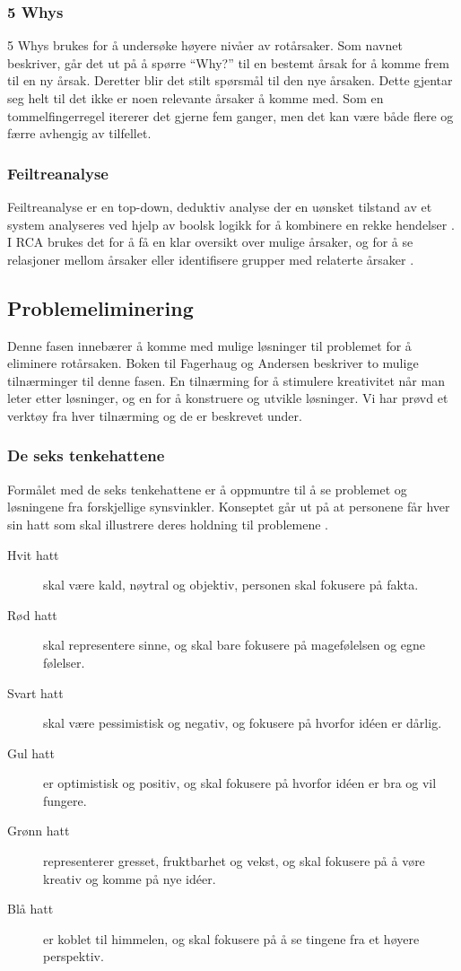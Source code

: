 \subsubsection{5 Whys}
5 Whys brukes for å undersøke høyere nivåer av rotårsaker. Som navnet beskriver, går det ut på å spørre ``Why?'' til en bestemt årsak for å komme frem til en ny årsak. Deretter blir det stilt spørsmål til den nye årsaken. Dette gjentar seg helt til det ikke er noen relevante årsaker å komme med. Som en tommelfingerregel itererer det gjerne fem ganger, men det kan være både flere og færre avhengig av tilfellet. 

\subsubsection{Feiltreanalyse}
Feiltreanalyse er en top-down, deduktiv analyse der en uønsket tilstand av et system analyseres ved hjelp av boolsk logikk for å kombinere en rekke hendelser \cite{wiki:faulttree}. I RCA brukes det for å få en klar oversikt over mulige årsaker, og for å se relasjoner mellom årsaker eller identifisere grupper med relaterte årsaker \cite{RCA}. 

\subsection{Problemeliminering}
Denne fasen innebærer å komme med mulige løsninger til problemet for å eliminere rotårsaken. Boken til Fagerhaug og Andersen \cite{RCA} beskriver to mulige tilnærminger til denne fasen. En tilnærming for å stimulere kreativitet når man leter etter løsninger, og en for å konstruere og utvikle løsninger. Vi har prøvd et verktøy fra hver tilnærming og de er beskrevet under. 

\subsubsection{De seks tenkehattene}
Formålet med de seks tenkehattene er å oppmuntre til å se problemet og løsningene fra forskjellige synsvinkler. Konseptet går ut på at personene får hver sin hatt som skal illustrere deres holdning til problemene \cite{RCA}. 

\begin{description}
    \item[Hvit hatt] skal være kald, nøytral og objektiv, personen skal fokusere på fakta.
    \item[Rød hatt] skal representere sinne, og skal bare fokusere på magefølelsen og egne følelser.
    \item[Svart hatt] skal være pessimistisk og negativ, og fokusere på hvorfor idéen er dårlig.
    \item[Gul hatt] er optimistisk og positiv, og skal fokusere på hvorfor idéen er bra og vil fungere.
    \item[Grønn hatt] representerer gresset, fruktbarhet og vekst, og skal fokusere på å vøre kreativ og komme på nye idéer.
    \item[Blå hatt] er koblet til himmelen, og skal fokusere på å se tingene fra et høyere perspektiv.
\end{description}

